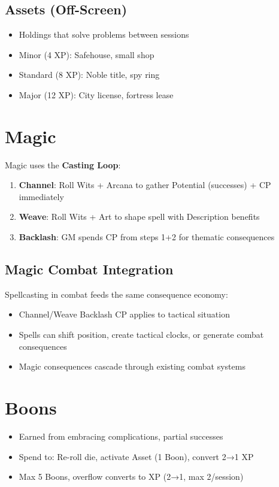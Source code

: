 \documentclass[11pt]{article}
\begin{document}
\subsection{Assets (Off-Screen)}
\begin{itemize}
    \item Holdings that solve problems between sessions
    \item Minor (4 XP): Safehouse, small shop
    \item Standard (8 XP): Noble title, spy ring
    \item Major (12 XP): City license, fortress lease
\end{itemize}

\section{Magic}

Magic uses the \textbf{Casting Loop}:

\begin{enumerate}
    \item \textbf{Channel}: Roll Wits + Arcana to gather Potential (successes) + CP immediately
    \item \textbf{Weave}: Roll Wits + Art to shape spell with Description benefits
    \item \textbf{Backlash}: GM spends CP from steps 1+2 for thematic consequences
\end{enumerate}

\subsection{Magic Combat Integration}
Spellcasting in combat feeds the same consequence economy:
\begin{itemize}
    \item Channel/Weave Backlash CP applies to tactical situation
    \item Spells can shift position, create tactical clocks, or generate combat consequences
    \item Magic consequences cascade through existing combat systems
\end{itemize}

\section{Boons}

\begin{itemize}
    \item Earned from embracing complications, partial successes
    \item Spend to: Re-roll die, activate Asset (1 Boon), convert 2→1 XP
    \item Max 5 Boons, overflow converts to XP (2→1, max 2/session)
\end{itemize}
\end{document}
